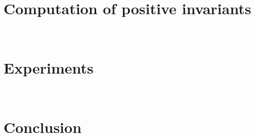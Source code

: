 \documentclass{llncs}
\begin{document}
\section{Computation of positive invariants}~\label{sec:invcomp}


\vspace{-1em}
\section{Experiments}~\label{sec:exp}

\vspace{-0.5em}

\section{Conclusion}~\label{sec:conclusion}


\newpage
%



\appendix

\end{document}
